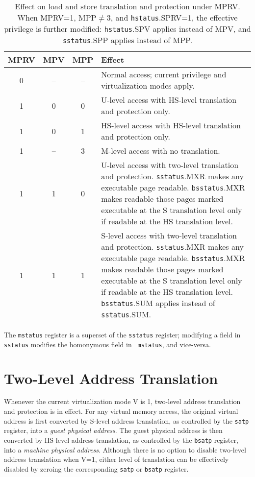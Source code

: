\begin{table*}[h!]
\begin{center}
\begin{tabular}{|c|c|c||p{5in}|}
  \hline
   MPRV & MPV & MPP & Effect \\ \hline \hline
   0    & --  & --  & Normal access; current privilege and virtualization modes apply. \\ \hline
   1    & 0   & 0   & U-level access with HS-level translation and protection only. \\ \hline
   1    & 0   & 1   & HS-level access with HS-level translation and protection only.  \\ \hline
   1    & --  & 3   & M-level access with no translation. \\ \hline
   1    & 1   & 0   & U-level access with two-level translation and protection. {\tt sstatus}.MXR makes any executable page readable.  {\tt bsstatus}.MXR makes readable those pages marked executable at the S translation level only if readable at the HS translation level. \\ \hline
   1    & 1   & 1   & S-level access with two-level translation and protection. {\tt sstatus}.MXR makes any executable page readable.  {\tt bsstatus}.MXR makes readable those pages marked executable at the S translation level only if readable at the HS translation level. {\tt bsstatus}.SUM applies instead of {\tt sstatus}.SUM. \\ \hline
 \end{tabular}
\end{center}
\caption{Effect on load and store translation and protection under MPRV.  When MPRV=1, MPP$\neq$3, and {\tt hstatus}.SPRV=1, the effective privilege is further modified: {\tt hstatus}.SPV applies instead of MPV, and {\tt sstatus}.SPP applies instead of MPP.}
\label{h-mprv}
\end{table*}

The {\tt mstatus} register is a superset of the {\tt sstatus} register;
modifying a field in {\tt sstatus} modifies the homonymous field in {\tt
mstatus}, and vice-versa.

\section{Two-Level Address Translation}

Whenever the current virtualization mode V is 1, two-level address translation
and protection is in effect.  For any virtual memory access, the original
virtual address is first converted
by S-level address translation, as controlled by the {\tt satp} register, into
a {\em guest physical address}.  The guest physical address is then
converted by HS-level address translation, as controlled by the {\tt bsatp}
register, into a {\em machine physical address}.
Although there is no option to disable two-level address translation when V=1,
either level of translation can be effectively disabled by zeroing the
corresponding {\tt satp} or {\tt bsatp} register.

